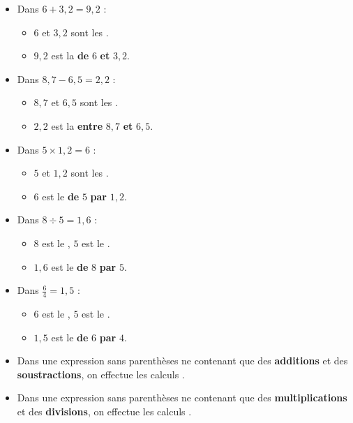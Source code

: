 \documentclass[../€Cours-complet/Cours-complet]{subfiles}
\begin{document}
\begin{exemple}
	\begin{itemize}
		\item Dans $6 + 3,2 = 9,2$ :
		      \begin{itemize}
			      \item $6$ et $3,2$ sont les .
			      \item $9,2$ est la  \textbf{de} $6$ \textbf{et} $3,2$.
		      \end{itemize}
		\item Dans $8,7 - 6,5 = 2,2$ :
		      \begin{itemize}
			      \item $8,7$ et $6,5$ sont les .
			      \item $2,2$ est la  \textbf{entre} $8,7$ \textbf{et} $6,5$.
		      \end{itemize}
		\item Dans $5 × 1,2 = 6$ :
		      \begin{itemize}
			      \item $5$ et $1,2$ sont les .
			      \item $6$ est le  \textbf{de} $5$ \textbf{par} $1,2$.
		      \end{itemize}
		\item Dans $8 ÷ 5 = 1,6$ :
		      \begin{itemize}
			      \item $8$ est le , $5$ est le .
			      \item $1,6$ est le  \textbf{de} $8$ \textbf{par} $5$.
		      \end{itemize}
		\item Dans $\frac{6}{4} = 1,5$ :
		      \begin{itemize}
			      \item $6$ est le , $5$ est le .
			      \item $1,5$ est le  \textbf{de} $6$ \textbf{par} $4$.
		      \end{itemize}
	\end{itemize}
\end{exemple}

\begin{cours}
	\begin{itemize}
		\item Dans une expression sans parenthèses ne contenant que des \textbf{additions} et des \textbf{soustractions}, on effectue les calculs .
		\item Dans une expression sans parenthèses ne contenant que des \textbf{multiplications} et des \textbf{divisions}, on effectue les calculs .
	\end{itemize}
\end{cours}
\end{document}
